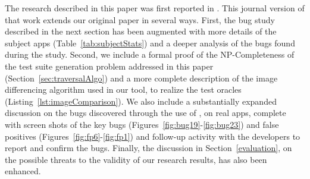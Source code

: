 The research described in this paper was first reported in \cite{quantum:ICST2013}. This journal version of that work
extends our original paper in several ways. First, the bug study described in the next section has been augmented with 
more details of the subject apps (Table~\ref{tab:subjectStats}) and a deeper analysis of the bugs found during the 
study. Second, we include a formal proof of the NP-Completeness of the test suite generation problem addressed in this
paper (Section~\ref{sec:traversalAlgo}) and a more complete description of the image differencing algorithm used in our \tool{} tool, to realize the
test oracles (Listing~\ref{lst:imageComparison}). We also include a substantially expanded discussion on the bugs 
discovered through the use of \tool, on real apps, complete with screen shots of the key bugs (Figures~\ref{fig:bug19}-\ref{fig:bug23}) and false positives (Figures~\ref{fig:fp6}-\ref{fig:fp1})
and follow-up activity with the developers to report and confirm the bugs.
Finally, the discussion in Section~\ref{evaluation}, on the possible threats to the validity of our research results, has also been enhanced.
